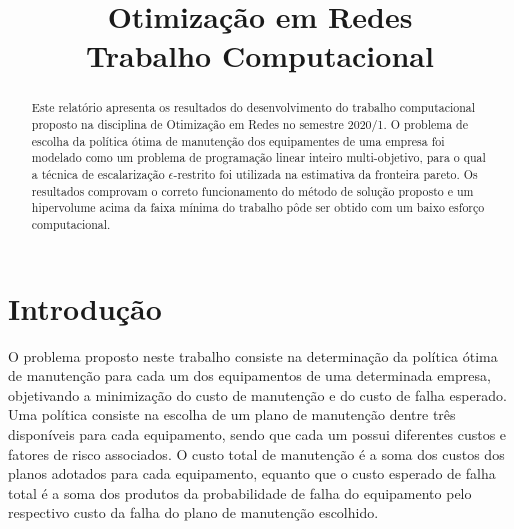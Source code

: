 \documentclass[conference]{IEEEtran}
\begin{document}
\title{Otimização em Redes \\ Trabalho Computacional}


\author{
}





\maketitle

\begin{abstract}
Este relatório apresenta os resultados do desenvolvimento do trabalho computacional proposto na disciplina de Otimização em Redes no semestre 2020/1. O problema de escolha da política ótima de manutenção dos equipamentes de uma empresa foi modelado como um problema de programação linear inteiro multi-objetivo, para o qual a técnica de escalarização $\epsilon$-restrito foi utilizada na estimativa da fronteira pareto. Os resultados comprovam o correto funcionamento do método de solução proposto e um hipervolume acima da faixa mínima do trabalho pôde ser obtido com um baixo esforço computacional.

\end{abstract}


%



\section{Introdução}
O problema proposto neste trabalho consiste na determinação da política ótima de manutenção para cada um dos equipamentos de uma determinada empresa, objetivando a minimização do custo de manutenção e do custo de falha esperado. Uma política consiste na escolha de um plano de manutenção dentre três disponíveis para cada equipamento, sendo que cada um possui diferentes custos e fatores de risco associados. O custo total de manutenção é a soma dos custos dos planos adotados para cada equipamento, equanto que o custo esperado de falha total é a soma dos produtos da probabilidade de falha do equipamento pelo respectivo custo da falha do plano de manutenção escolhido.
\end{document}
